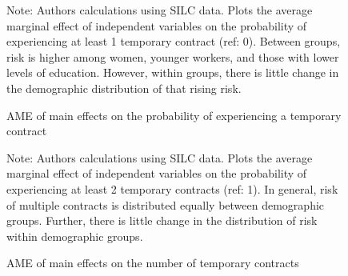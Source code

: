 \documentclass[12pt]{article}
\begin{document}
\begin{figure}
    \caption{AME of main effects on the probability of experiencing a temporary contract}
    \label{graph_glm_mfx_ever}
    \footnotesize{Note: Authors calculations using SILC data.  Plots the average marginal effect of independent variables on the probability of experiencing at least 1 temporary contract (ref: 0).  Between groups, risk is higher among women, younger workers, and those with lower levels of education.  However, within groups, there is little change in the demographic distribution of that rising risk.}
\end{figure}

\clearpage
\begin{figure}
    \caption{AME of main effects on the number of temporary contracts}
    \label{graph_glm_mfx_num}
    \footnotesize{Note: Authors calculations using SILC data.  Plots the average marginal effect of independent variables on the probability of experiencing at least 2 temporary contracts (ref: 1).  In general, risk of multiple contracts is distributed equally between demographic groups.  Further, there is little change in the distribution of risk within demographic groups.}
\end{figure}
\end{document}
